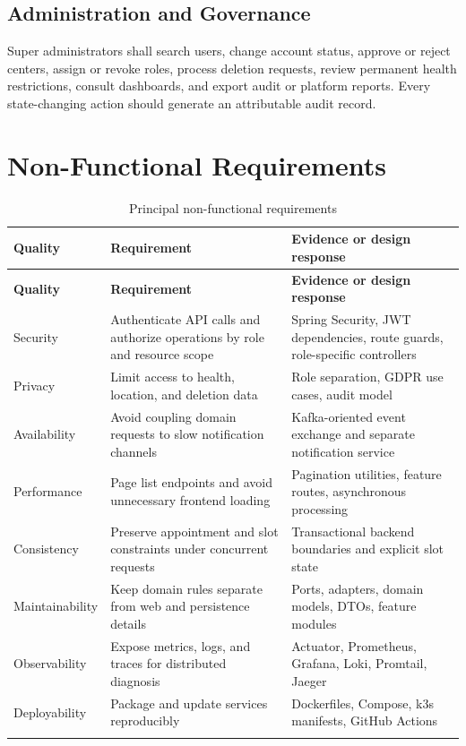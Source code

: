 \subsection{Administration and Governance}
Super administrators shall search users, change account status, approve or reject centers, assign or revoke roles, process deletion requests, review permanent health restrictions, consult dashboards, and export audit or platform reports. Every state-changing action should generate an attributable audit record.

\section{Non-Functional Requirements}
\begin{longtable}{|P{3.0cm}|P{7.1cm}|P{3.4cm}|}
\hline
{}\textbf{Quality} & \textbf{Requirement} & \textbf{Evidence or design response}\\ \hline
\endfirsthead
\hline{}\textbf{Quality} & \textbf{Requirement} & \textbf{Evidence or design response}\\ \hline
\endhead
Security & Authenticate API calls and authorize operations by role and resource scope & Spring Security, JWT dependencies, route guards, role-specific controllers\\ \hline
Privacy & Limit access to health, location, and deletion data & Role separation, GDPR use cases, audit model\\ \hline
Availability & Avoid coupling domain requests to slow notification channels & Kafka-oriented event exchange and separate notification service\\ \hline
Performance & Page list endpoints and avoid unnecessary frontend loading & Pagination utilities, feature routes, asynchronous processing\\ \hline
Consistency & Preserve appointment and slot constraints under concurrent requests & Transactional backend boundaries and explicit slot state\\ \hline
Maintainability & Keep domain rules separate from web and persistence details & Ports, adapters, domain models, DTOs, feature modules\\ \hline
Observability & Expose metrics, logs, and traces for distributed diagnosis & Actuator, Prometheus, Grafana, Loki, Promtail, Jaeger\\ \hline
Deployability & Package and update services reproducibly & Dockerfiles, Compose, k3s manifests, GitHub Actions\\ \hline
\caption{Principal non-functional requirements}
\label{tab:nfr}
\end{longtable}

